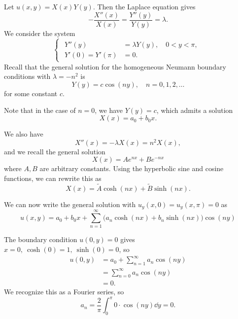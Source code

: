 \documentclass[plain]{pset}
\begin{document}
\begin{solution}
    Let \(u(x, y) = X(x)Y(y)\). Then the Laplace equation gives
    \[-\frac{X''(x)}{X(x)} = \frac{Y''(y)}{Y(y)} = \lambda.\]
    We consider the system
    \[
        \begin{cases}
            \begin{aligned}
                Y''(y)          & = \lambda Y(y), \quad 0 < y < \pi, \\
                Y'(0) = Y'(\pi) & = 0.
            \end{aligned}
        \end{cases}
    \]
    Recall that the general solution for the homogeneous Neumann boundary conditions with \(\lambda = -n^2\) is
    \[Y(y) = c\cos(ny), \quad n = 0, 1, 2, \ldots\]
    for some constant \(c\).

    Note that in the case of \(n = 0\), we have \(Y(y) = c\), which admits a solution
    \[X(x) = a_0 + b_0 x.\]

    We also have
    \[X''(x) = -\lambda X(x) = n^2 X(x),\]
    and we recall the general solution
    \[X(x) = Ae^{nx} + Be^{-nx}\]
    where \(A, B\) are arbitrary constants. Using the hyperbolic sine and cosine functions, we can rewrite this as
    \[X(x) = \tilde{A}\cosh(nx) + \tilde{B}\sinh(nx).\]

    We can now write the general solution with \(u_y(x, 0) = u_y(x, \pi) = 0\) as
    \[u(x, y) = a_0 + b_0 x + \sum_{n=1}^\infty \bigl(a_n \cosh(nx) + b_n \sinh(nx)\bigr)\cos(ny)\]

    The boundary condition \(u(0, y) = 0\) gives \(x = 0, \ \cosh(0) = 1, \ \sinh(0) = 0\), so
    \begin{align*}
        u(0, y) & = a_0 + \sum_{n=1}^\infty a_n \cos(ny) \\
                & = \sum_{n=0}^\infty a_n \cos(ny)       \\
                & = 0.
    \end{align*}
    We recognize this as a Fourier series, so
    \[a_n = \frac{2}{\pi} \int_0^\pi 0 \cdot \cos(ny) \dd y = 0.\]


\end{solution}
\end{document}
